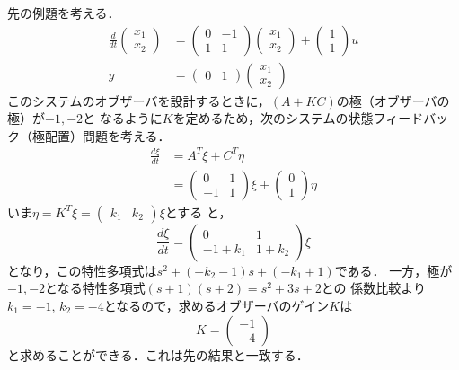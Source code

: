 先の例題を考える．
\begin{align}
 \frac{d}{dt}
 \left(
 \begin{array}{c}
  x_1 \\
  x_2
 \end{array}
 \right)
 &=
 \left(
 \begin{array}{cc}
  0 & -1 \\
  1 & 1
 \end{array}
 \right)
 \left(
 \begin{array}{c}
  x_1 \\
  x_2
 \end{array}
 \right) +
 \left(
 \begin{array}{c}
  1 \\
  1
 \end{array}
 \right) u \\
 y &=
 \left(
 \begin{array}{cc}
  0 & 1
 \end{array}
 \right)
 \left(
 \begin{array}{c}
  x_1 \\
  x_2
 \end{array}
 \right)
\end{align}
このシステムのオブザーバを設計するときに，$(A+KC)$の極（オブザーバの極）が$-1,-2$と
なるように$K$を定めるため，次のシステムの状態フィードバック（極配置）問題を考える．
\begin{align}
 \frac{d\xi}{dt} &= A^T \xi + C^T \eta \nonumber \\
 &=
 \left(
 \begin{array}{cc}
  0 & 1 \\
  -1 & 1
 \end{array}
 \right) \xi +
 \left(
 \begin{array}{c}
  0 \\
  1
 \end{array}
 \right) \eta
\end{align}
いま$\eta = K^T \xi = (\begin{array}{cc}k_1 & k_2\end{array})\xi$とする
と，
\begin{equation}
 \frac{d\xi}{dt} =
 \left(
 \begin{array}{cc}
  0 & 1 \\
  -1+k_1 & 1 + k_2
 \end{array}
 \right) \xi
\end{equation}
となり，この特性多項式は$s^2 + (-k_2 - 1)s + (-k_1 + 1)$である．
一方，極が$-1, -2$となる特性多項式$(s+1)(s+2) = s^2 + 3s + 2$との
係数比較より$k_1 = -1$, $k_2 = -4$となるので，求めるオブザーバのゲイン$K$は
\[
 K = 
 \left(
 \begin{array}{c}
  -1 \\
  -4
 \end{array}
 \right)
\]
と求めることができる．これは先の結果と一致する．
\\

